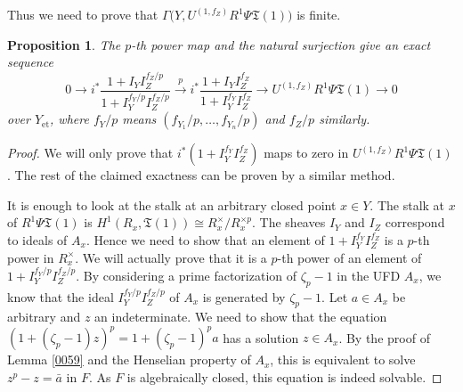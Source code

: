 \documentclass{amsart}
\newtheorem{Prop}[Thm]{Proposition}
\theoremstyle{remark}
\numberwithin{equation}{section}
\newcommand{\et}{\mathrm{et}}
\begin{document}
Thus we need to prove that 
	$
		\Gamma \bigl(
			Y, U^{(1, f_{Z})} R^{1} \Psi \mathfrak{T}(1)
		\bigr)
	$
is finite.

\begin{Prop}
	The $p$-th power map and the natural surjection give an exact sequence
		\begin{equation} \label{0005}
				0
			\to
				i^{\ast}
				\frac{
					1 + I_{Y} I_{Z}^{f_{Z} / p}
				}{
					1 + I_{Y}^{f_{Y} / p} I_{Z}^{f_{Z} / p}
				}
			\stackrel{p}{\to}
				i^{\ast}
				\frac{
					1 + I_{Y} I_{Z}^{f_{Z}}
				}{
					1 + I_{Y}^{f_{Y}} I_{Z}^{f_{Z}}
				}
			\to
				U^{(1, f_{Z})} R^{1} \Psi \mathfrak{T}(1)
			\to
				0
		\end{equation}
	over $Y_{\et}$,
	where $f_{Y} / p$ means $(f_{Y_{1}} / p, \dots, f_{Y_{n}} / p)$
	and $f_{Z} / p$ similarly.
\end{Prop}

\begin{proof}
	We will only prove that $i^{\ast}(1 + I_{Y}^{f_{Y}} I_{Z}^{f_{Z}})$ maps to zero
	in $U^{(1, f_{Z})} R^{1} \Psi \mathfrak{T}(1)$.
	The rest of the claimed exactness can be proven by a similar method.
	
	It is enough to look at the stalk at an arbitrary closed point $x \in Y$.
	The stalk at $x$ of $R^{1} \Psi \mathfrak{T}(1)$ is
	$H^{1}(R_{x}, \mathfrak{T}(1)) \cong R_{x}^{\times} / R_{x}^{\times p}$.
	The sheaves $I_{Y}$ and $I_{Z}$ correspond to ideals of $A_{x}$.
	Hence we need to show that an element of $1 + I_{Y}^{f_{Y}} I_{Z}^{f_{Z}}$
	is a $p$-th power in $R_{x}^{\times}$.
	We will actually prove that it is a $p$-th power of an element of
	$1 + I_{Y}^{f_{Y} / p} I_{Z}^{f_{Z} / p}$.
	By considering a prime factorization of $\zeta_{p} - 1$ in the UFD $A_{x}$,
	we know that the ideal $I_{Y}^{f_{Y} / p} I_{Z}^{f_{Z} / p}$ of $A_{x}$ is
	generated by $\zeta_{p} - 1$.
	Let $a \in A_{x}$ be arbitrary and $z$ an indeterminate.
	We need to show that the equation
	$(1 + (\zeta_{p} - 1) z)^{p} = 1 + (\zeta_{p} - 1)^{p} a$
	has a solution $z \in A_{x}$.
	By the proof of Lemma \ref{0059} and the Henselian property of $A_{x}$,
	this is equivalent to solve $z^{p} - z = \bar{a}$ in $F$.
	As $F$ is algebraically closed, this equation is indeed solvable.
\end{proof}
\end{document}

